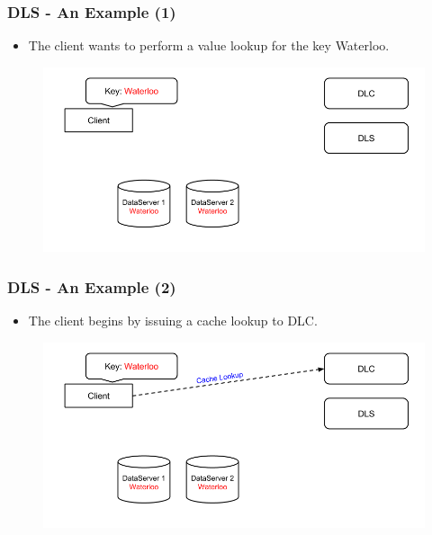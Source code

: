 \documentclass{beamer}
\begin{document}
\begin{frame}
  \frametitle{DLS - An Example (1)}
  \begin{itemize}
  \item The client wants to perform a value lookup for the key Waterloo.
  \end{itemize}
  \begin{figure}
    \begin{center}
      \centerline{\includegraphics[scale=0.40]{img/DLS_Example01.png}}
    \end{center}
  \end{figure}
\end{frame}

\begin{frame}
  \frametitle{DLS - An Example (2)}
  \begin{itemize}
  \item The client begins by issuing a cache lookup to DLC.
\newline
  \end{itemize}
  \begin{figure}
    \begin{center}
      \centerline{\includegraphics[scale=0.40]{img/DLS_Example02.png}}
    \end{center}
  \end{figure}
\end{frame}
\end{document}
